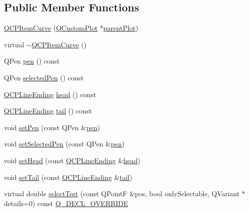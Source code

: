 \subsection*{Public Member Functions}
\begin{DoxyCompactItemize}
\item 
\mbox{\hyperlink{class_q_c_p_item_curve_ac9b7508bb5c8827e1a7a6199f8c82bec}{Q\+C\+P\+Item\+Curve}} (\mbox{\hyperlink{class_q_custom_plot}{Q\+Custom\+Plot}} $\ast$\mbox{\hyperlink{class_q_c_p_layerable_a473edb813a4c1929d6b6a8fe3ff3faf7}{parent\+Plot}})
\item 
virtual \mbox{\hyperlink{class_q_c_p_item_curve_ae36f20fd5deff2f1443a7c53eaa95c81}{$\sim$\+Q\+C\+P\+Item\+Curve}} ()
\item 
Q\+Pen \mbox{\hyperlink{class_q_c_p_item_curve_aefe2e9affaa9c70f434a076def4a7ea5}{pen}} () const
\item 
Q\+Pen \mbox{\hyperlink{class_q_c_p_item_curve_a4827e5f89e8fb3b2760871c4e5315322}{selected\+Pen}} () const
\item 
\mbox{\hyperlink{class_q_c_p_line_ending}{Q\+C\+P\+Line\+Ending}} \mbox{\hyperlink{class_q_c_p_item_curve_a86467ff1dc9cbcefead6333bd5e27393}{head}} () const
\item 
\mbox{\hyperlink{class_q_c_p_line_ending}{Q\+C\+P\+Line\+Ending}} \mbox{\hyperlink{class_q_c_p_item_curve_aaef82aa581f6996444028027d6829acc}{tail}} () const
\item 
void \mbox{\hyperlink{class_q_c_p_item_curve_a034be908440aec785c34b92843461221}{set\+Pen}} (const Q\+Pen \&\mbox{\hyperlink{class_q_c_p_item_curve_aefe2e9affaa9c70f434a076def4a7ea5}{pen}})
\item 
void \mbox{\hyperlink{class_q_c_p_item_curve_a375b917669f868c5a106bf2f1ab7c26d}{set\+Selected\+Pen}} (const Q\+Pen \&\mbox{\hyperlink{class_q_c_p_item_curve_aefe2e9affaa9c70f434a076def4a7ea5}{pen}})
\item 
void \mbox{\hyperlink{class_q_c_p_item_curve_a08a30d9cdd63995deea3d9e20430676f}{set\+Head}} (const \mbox{\hyperlink{class_q_c_p_line_ending}{Q\+C\+P\+Line\+Ending}} \&\mbox{\hyperlink{class_q_c_p_item_curve_a86467ff1dc9cbcefead6333bd5e27393}{head}})
\item 
void \mbox{\hyperlink{class_q_c_p_item_curve_ac3488d8b1a6489c845dc5bff3ef71124}{set\+Tail}} (const \mbox{\hyperlink{class_q_c_p_line_ending}{Q\+C\+P\+Line\+Ending}} \&\mbox{\hyperlink{class_q_c_p_item_curve_aaef82aa581f6996444028027d6829acc}{tail}})
\item 
virtual double \mbox{\hyperlink{class_q_c_p_item_curve_a718fa40140a43c8afbd41a3d85c92d72}{select\+Test}} (const Q\+PointF \&pos, bool only\+Selectable, Q\+Variant $\ast$details=0) const \mbox{\hyperlink{qcustomplot_8h_a42cc5eaeb25b85f8b52d2a4b94c56f55}{Q\+\_\+\+D\+E\+C\+L\+\_\+\+O\+V\+E\+R\+R\+I\+DE}}
\end{DoxyCompactItemize}
